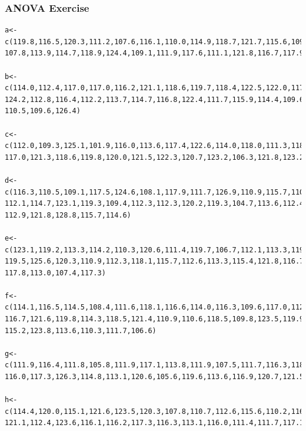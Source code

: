 \documentclass[xcolor=dvipsnames]{beamer} \usepackage{teachbeamer}
\begin{document}
\begin{frame}[fragile]
  \frametitle{ANOVA Exercise}
  \begin{footnotesize}
\begin{verbatim}
a<-c(119.8,116.5,120.3,111.2,107.6,116.1,110.0,114.9,118.7,121.7,115.6,109.4,
107.8,113.9,114.7,118.9,124.4,109.1,111.9,117.6,111.1,121.8,116.7,117.9,117.9)

b<-c(114.0,112.4,117.0,117.0,116.2,121.1,118.6,119.7,118.4,122.5,122.0,117.8,
124.2,112.8,116.4,112.2,113.7,114.7,116.8,122.4,111.7,115.9,114.4,109.6,123.2,
110.5,109.6,126.4)

c<-c(112.0,109.3,125.1,101.9,116.0,113.6,117.4,122.6,114.0,118.0,111.3,118.4,
117.0,121.3,118.6,119.8,120.0,121.5,122.3,120.7,123.2,106.3,121.8,123.2)

d<-c(116.3,110.5,109.1,117.5,124.6,108.1,117.9,111.7,126.9,110.9,115.7,110.8,
112.1,114.7,123.1,119.3,109.4,112.3,112.3,120.2,119.3,104.7,113.6,112.4,115.2,
112.9,121.8,128.8,115.7,114.6)

e<-c(123.1,119.2,113.3,114.2,110.3,120.6,111.4,119.7,106.7,112.1,113.3,119.3,
119.5,125.6,120.3,110.9,112.3,118.1,115.7,112.6,113.3,115.4,121.8,116.7,109.1,
117.8,113.0,107.4,117.3)

f<-c(114.1,116.5,114.5,108.4,111.6,118.1,116.6,114.0,116.3,109.6,117.0,112.0,
116.7,121.6,119.8,114.3,118.5,121.4,110.9,110.6,118.5,109.8,123.5,119.9,114.1,
115.2,123.8,113.6,110.3,111.7,106.6)

g<-c(111.9,116.4,111.8,105.8,111.9,117.1,113.8,111.9,107.5,111.7,116.3,118.4,
116.0,117.3,126.3,114.8,113.1,120.6,105.6,119.6,113.6,116.9,120.7,121.5,117.1,117.4)

h<-c(114.4,120.0,115.1,121.6,123.5,120.3,107.8,110.7,112.6,115.6,110.2,116.3,
121.1,112.4,123.6,116.1,116.2,117.3,116.3,113.1,116.0,111.4,111.7,117.1,116.2,113.9)
\end{verbatim}
  \end{footnotesize}
\end{frame}
\end{document}
